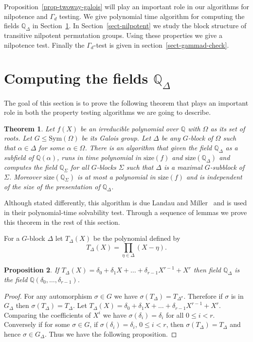 \documentclass[11pt]{madras}%
\newtheorem{theorem}{Theorem}[chapter]
\newtheorem{proposition}[theorem]{Proposition}
\theoremstyle{remark}
\newcommand{\Sym}[1]{{\ensuremath{\mathrm{Sym}\left(#1\right)}}}
\newcommand{\size}[1]{{\ensuremath{\mathrm{size}\left(#1\right)}}}
\begin{document}
Proposition~\ref{prop-twoway-galois} will play an important role in
our algorithms for nilpotence and $\Gamma_d$ testing. We give
polynomial time algorithm for computing the fields $\mathbb{Q}_\Delta$
in Section~\ref{sect-compute-qdelta}.  In Section~\ref{sect-nilpotent}
we study the block structure of transitive nilpotent permutation
groups.  Using these properties we give a nilpotence test.  Finally
the $\Gamma_d$-test is given in section~\ref{sect-gammad-check}.


\section{Computing the fields $\mathbb{Q}_\Delta$}
\label{sect-compute-qdelta}

The goal of this section is to prove the following theorem that plays
an important role in both the property testing algorithms we are going
to describe.

\begin{theorem}\label{thm-enlarge-block}
  Let $f(X)$ be an irreducible polynomial over $\mathbb{Q}$ with
  $\Omega$ as its set of roots. Let $G \leq \Sym{\Omega}$ be its
  Galois group. Let $\Delta$ be any $G$-block of $\Omega$ such that
  $\alpha\in \Delta$ for some $\alpha \in \Omega$.  There is an
  algorithm that given the field $\mathbb{Q}_\Delta$ as a subfield of
  $\mathbb{Q}(\alpha)$, runs in time polynomial in $\size{f}$ and
  $\size{\mathbb{Q}_\Delta}$ and computes the field
  $\mathbb{Q}_\Sigma$ for all $G$-blocks $\Sigma$ such that $\Delta$
  is a maximal $G$-subblock of $\Sigma$.  Moreover
  $\size{\mathbb{Q}_\Sigma}$ is at most a polynomial in $\size{f}$ and
  is independent of the size of the presentation of
  $\mathbb{Q}_\Delta$.
\end{theorem}

Although stated differently, this algorithm is due Landau and
Miller~\cite{landau85solvability} and is used in their polynomial-time
solvability test. Through a sequence of lemmas we prove this theorem
in the rest of this section.

For a $G$-block $\Delta$ let $T_\Delta(X)$ be the polynomial defined
by
\[
T_\Delta(X) = \prod_{\eta \in \Delta} (X - \eta).
\]


\begin{proposition}\label{prop-tdelta-qdelta}
  If $T_\Delta(X) = \delta_0 + \delta_1 X + \ldots + \delta_{r-1}
  X^{r-1} + X^r$ then field $\mathbb{Q}_\Delta$ is the field
  $\mathbb{Q}(\delta_0,\ldots,\delta_{r-1})$.
\end{proposition}
\begin{proof}
  For any automorphism $\sigma \in G$ we have $\sigma (T_\Delta) =
  T_{\Delta^\sigma}$. Therefore if $\sigma$ is in $G_\Delta$ then
  $\sigma (T_\Delta) = T_\Delta$. Let $T_\Delta(X) = \delta_0 +
  \delta_1 X + \ldots + \delta_{r-1} X^{r-1} + X^r$.  Comparing the
  coefficients of $X^i$ we have $\sigma(\delta_i) = \delta_i$ for all
  $0 \leq i < r$.  Conversely if for some $\sigma \in G$, if
  $\sigma(\delta_i) = \delta_i$, $0 \leq i < r$, then
  $\sigma(T_\Delta) = T_\Delta$ and hence $\sigma \in G_\Delta$.  Thus
  we have the following proposition.
\end{proof}
\end{document}
